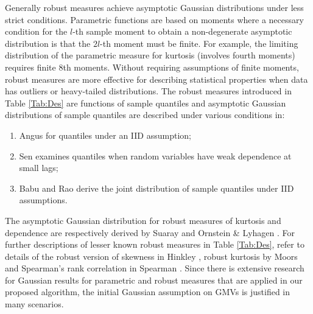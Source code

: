 Generally  robust  measures achieve asymptotic Gaussian distributions under less strict conditions.
Parametric functions are based on moments  where a necessary condition for   the $l$-th sample moment to obtain a non-degenerate asymptotic distribution is that the $2l$-th moment must be finite.     For example,  the limiting distribution of the parametric measure for  kurtosis (involves fourth moments)  requires finite   8th moments.  Without requiring assumptions of finite moments, robust measures
are more effective for describing statistical properties when data has outliers or heavy-tailed distributions.  
 The robust measures introduced in Table \ref{Tab:Des}  are functions of sample quantiles and asymptotic Gaussian distributions of sample quantiles 
 are described under various conditions in: 
\begin{enumerate}
\item  Angus \cite{Quantiles} for quantiles under an IID assumption;
 \item Sen \cite{sen1968} examines quantiles when random variables have weak dependence at small lags;
\item Babu and Rao \cite{babu1988} derive the joint  distribution of sample quantiles under IID assumptions.
\end{enumerate}
 The asymptotic Gaussian distribution for   robust measures of kurtosis and dependence are respectively derived by  Suaray \cite{suaray2015}  and
Ornstein \& Lyhagen \cite{SpearmanRho}. 
For further descriptions of lesser known robust measures in Table \ref{Tab:Des}, refer to details of the robust version of skewness in Hinkley   \cite{hinkley1975},  
robust kurtosis by Moors \cite{RobustK} and Spearman's rank correlation in Spearman \cite{Spearman}. Since there is extensive research  for Gaussian results for parametric and robust measures that are applied in our proposed algorithm, the initial Gaussian assumption on GMVs is justified in many scenarios.  
 

